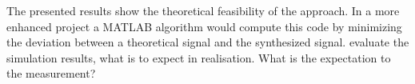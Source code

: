  The presented results show the theoretical feasibility of the approach.
 In a more enhanced project a MATLAB algorithm would compute this code by minimizing the deviation between a theoretical signal and the synthesized signal.
evaluate the simulation results, what is to expect in realisation. 
What is the expectation to the measurement?
